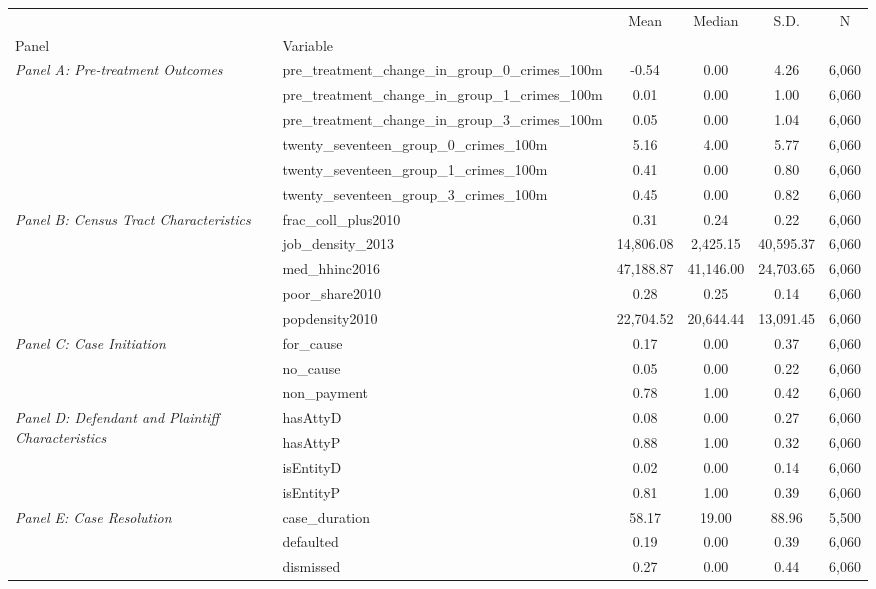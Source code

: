 \begin{tabular}{llcccc}
\toprule
 &  & Mean & Median & S.D. & N \\
Panel & Variable &  &  &  &  \\
\midrule
\multirow[c]{6}{4cm}{\textit{Panel A: Pre-treatment Outcomes}} & pre_treatment_change_in_group_0_crimes_100m & -0.54 & 0.00 & 4.26 & 6,060 \\
 & pre_treatment_change_in_group_1_crimes_100m & 0.01 & 0.00 & 1.00 & 6,060 \\
 & pre_treatment_change_in_group_3_crimes_100m & 0.05 & 0.00 & 1.04 & 6,060 \\
 & twenty_seventeen_group_0_crimes_100m & 5.16 & 4.00 & 5.77 & 6,060 \\
 & twenty_seventeen_group_1_crimes_100m & 0.41 & 0.00 & 0.80 & 6,060 \\
 & twenty_seventeen_group_3_crimes_100m & 0.45 & 0.00 & 0.82 & 6,060 \\
\cline{1-6}
\multirow[c]{5}{4cm}{\textit{Panel B: Census Tract Characteristics}} & frac_coll_plus2010 & 0.31 & 0.24 & 0.22 & 6,060 \\
 & job_density_2013 & 14,806.08 & 2,425.15 & 40,595.37 & 6,060 \\
 & med_hhinc2016 & 47,188.87 & 41,146.00 & 24,703.65 & 6,060 \\
 & poor_share2010 & 0.28 & 0.25 & 0.14 & 6,060 \\
 & popdensity2010 & 22,704.52 & 20,644.44 & 13,091.45 & 6,060 \\
\cline{1-6}
\multirow[c]{3}{4cm}{\textit{Panel C: Case Initiation}} & for_cause & 0.17 & 0.00 & 0.37 & 6,060 \\
 & no_cause & 0.05 & 0.00 & 0.22 & 6,060 \\
 & non_payment & 0.78 & 1.00 & 0.42 & 6,060 \\
\cline{1-6}
\multirow[c]{4}{4cm}{\textit{Panel D: Defendant and Plaintiff Characteristics}} & hasAttyD & 0.08 & 0.00 & 0.27 & 6,060 \\
 & hasAttyP & 0.88 & 1.00 & 0.32 & 6,060 \\
 & isEntityD & 0.02 & 0.00 & 0.14 & 6,060 \\
 & isEntityP & 0.81 & 1.00 & 0.39 & 6,060 \\
\cline{1-6}
\multirow[c]{6}{4cm}{\textit{Panel E: Case Resolution}} & case_duration & 58.17 & 19.00 & 88.96 & 5,500 \\
 & defaulted & 0.19 & 0.00 & 0.39 & 6,060 \\
 & dismissed & 0.27 & 0.00 & 0.44 & 6,060 \\

\end{tabular}
